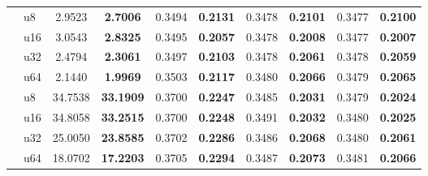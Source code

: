 \documentclass[fleqn,10pt]{wlscirep}
\begin{document}
\begin{table}[!t]
\begin{tabular}{@{}c l | *{3}{S[table-format=2.4]S[table-format=2.4,detect-weight,mode=text] |}S[table-format=2.4]S[table-format=2.4,detect-weight,mode=text]@{}}
\midrule
{} & u8  & 2.9523 & \bfseries 2.7006 & 0.3494 & \bfseries 0.2131 & 0.3478 & \bfseries 0.2101 & 0.3477 & \bfseries 0.2100\\
 & u16 & 3.0543 & \bfseries 2.8325 & 0.3495 & \bfseries 0.2057 & 0.3478 & \bfseries 0.2008 & 0.3477 & \bfseries 0.2007\\
 & u32 & 2.4794 & \bfseries 2.3061 & 0.3497 & \bfseries 0.2103 & 0.3478 & \bfseries 0.2061 & 0.3478 & \bfseries 0.2059\\
 & u64 & 2.1440 & \bfseries 1.9969 & 0.3503 & \bfseries 0.2117 & 0.3480 & \bfseries 0.2066 & 0.3479 & \bfseries 0.2065\\
\midrule
{} & u8  & 34.7538 & \bfseries 33.1909 & 0.3700 & \bfseries 0.2247 & 0.3485 & \bfseries 0.2031 & 0.3479 & \bfseries 0.2024\\
 & u16 & 34.8058 & \bfseries 33.2515 & 0.3700 & \bfseries 0.2248 & 0.3491 & \bfseries 0.2032 & 0.3480 & \bfseries 0.2025\\
 & u32 & 25.0050 & \bfseries 23.8585 & 0.3702 & \bfseries 0.2286 & 0.3486 & \bfseries 0.2068 & 0.3480 & \bfseries 0.2061\\
 & u64 & 18.0702 & \bfseries 17.2203 & 0.3705 & \bfseries 0.2294 & 0.3487 & \bfseries 0.2073 & 0.3481 & \bfseries 0.2066\\
\bottomrule
\end{tabular}
\end{table}
\end{document}
